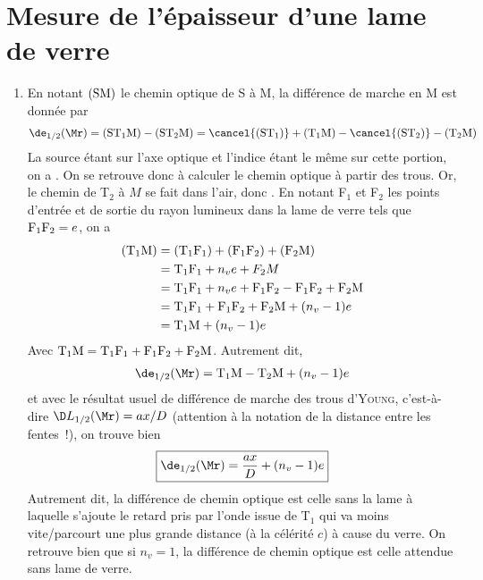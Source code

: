\documentclass[a4paper, 12pt, final, garamond]{book}
\begin{document}
\section{Mesure de l'épaisseur d'une lame de verre}
\begin{enumerate}
    \item En notant $({\rm SM})$ le chemin optique de S à M, la différence de
        marche en M est donnée par
        \begin{gather*}
            \de_{1/2}(\Mr)
                = \rm (ST_1M) - (ST_2M)
                = \rm \cancel{\rm (ST_1)} + (T_1M) - \cancel{\rm (ST_2)} - (T_2M)
        \end{gather*}
        La source étant sur l'axe optique et l'indice étant le même sur cette
        portion, on a . On se retrouve donc à calculer le
        chemin optique à partir des trous. Or, le chemin de T$_2$ à $M$ se fait
        dans l'air, donc . En notant F$_1$ et F$_2$ les
        points d'entrée et de sortie du rayon lumineux dans la lame de verre
        tels que ${\rm F_1F_2}=e$, on a
        \begin{align*}
            ({\rm T_1M})
                & = \rm (T_1F_1) + (F_1F_2) + \rm (F_2M)\\
                & = {\rm T_1F_1} + n_ve + {F_2M}\\
                & = {\rm T_1F_1} + n_ve + {\rm F_1F_2-F_1F_2} + \rm F_2M\\
                & = {\rm T_1F_1 + F_1F_2 + F_2M} + (n_v-1)e\\
                & = {\rm T_1M} + (n_v-1)e
        \end{align*}
        Avec $\rm T_1M = T_1F_1+F_1F_2+F_2M$. Autrement dit,
        \begin{gather*}
            \de_{1/2}(\Mr) = {\rm T_1M - T_2M} + (n_v-1)e
        \end{gather*}
        et avec le résultat usuel de différence de marche des trous
        d'\textsc{Young}, c'est-à-dire $\D L_{1/2}(\Mr) = ax/D$ (attention à la
        notation de la distance entre les fentes~!), on trouve bien
        \[\boxed{\de_{1/2}(\Mr) = \frac{ax}{D} + (n_v-1)e}\]
        Autrement dit, la différence de chemin optique est celle sans la
        lame à laquelle s'ajoute le retard pris par l'onde issue de T$_1$ qui
        va moins vite/parcourt une plus grande distance (à la célérité $c$) à
        cause du verre. On retrouve bien que si $n_v = 1$, la différence de
        chemin optique est celle attendue sans lame de verre.

\end{enumerate}
\end{document}
